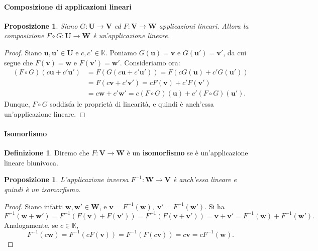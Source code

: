 \documentclass{article}
\theoremstyle{plain}
\newtheorem{prop}[thm]{Proposizione}
\theoremstyle{definition}
\newtheorem{defn}{Definizione}[section]
\theoremstyle{remark}
\begin{document}
\paragraph{Composizione di applicazioni lineari}
\begin{bxthm}
\begin{prop}
    Siano $G:\mathbf{U}\to\mathbf{V}$ ed $F:\mathbf{V}\to\mathbf{W}$ applicazioni lineari. Allora la composizione $F\circ G:\mathbf{U}\to\mathbf{W}$ è un'applicazione lineare. 
\end{prop}
\end{bxthm}
\begin{proof}
    Siano $\mathbf{u}, \mathbf{u'} \in \mathbf{U}$ e $c, c' \in \mathbb{K}$. 
    Poniamo $G(\mathbf{u}) = \mathbf{v}$ e $G(\mathbf{u'}) = \mathbf{v'}$, da cui segue che $F(\mathbf{v}) = \mathbf{w}$ e $F(\mathbf{v'}) = \mathbf{w'}$.
    Consideriamo ora:
    \begin{align*}
        (F \circ G)(c\mathbf{u} + c'\mathbf{u'}) &= F(G(c\mathbf{u} + c'\mathbf{u'})) = F(cG(\mathbf{u}) + c'G(\mathbf{u'})) \\
        &= F(c\mathbf{v} + c'\mathbf{v'}) = cF(\mathbf{v}) + c'F(\mathbf{v'})  \\
        &= c\mathbf{w} + c'\mathbf{w'} = c(F \circ G)(\mathbf{u}) + c'(F \circ G)(\mathbf{u'}).
    \end{align*}
    Dunque, $F \circ G$ soddisfa le proprietà di linearità, e quindi è anch'essa un'applicazione lineare.
\end{proof}

\vspace{10pt}

\paragraph{Isomorfismo}
\begin{bxthm}
\begin{defn}
    Diremo che $F:\mathbf{V}\to\mathbf{W}$ è un \textbf{isomorfismo} se è un'applicazione lineare biunivoca. 
\end{defn}
\end{bxthm}

\vspace{10pt}

\begin{bxthm}
\begin{prop}
    L'applicazione inversa $F^{-1}:\mathbf{W}\to\mathbf{V}$ è anch'essa lineare e quindi è un isomorfismo.
\end{prop}
\end{bxthm}
\begin{proof}
    Siano infatti $\mathbf{w},\mathbf{w}'\in\mathbf{W}$, e $\mathbf{v}=F^{-1}(\mathbf{w}),\;\mathbf{v}'=F^{-1}(\mathbf{w}')$. Si ha 
    \[ F^{-1}(\mathbf{w}+\mathbf{w}')=F^{-1}(F(\mathbf{v})+F(\mathbf{v}'))=F^{-1}(F(\mathbf{v}+\mathbf{v}'))=\mathbf{v}+\mathbf{v}'= F^{-1}(\mathbf{w})+F^{-1}(\mathbf{w}'). \]
    Analogamente, se $c\in\mathbb{K}$,
    \[F^{-1}(c\mathbf{w})=F^{-1}(cF(\mathbf{v}))=F^{-1}(F(c\mathbf{v}))=c\mathbf{v}=cF^{-1}(\mathbf{w}).\]
\end{proof}
\end{document}
